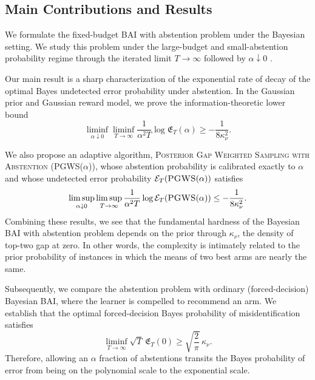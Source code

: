 \documentclass[10pt]{article}
\newcommand{\ouralgfull}{\textsc{Posterior Gap Weighted Sampling with Abstention}}
\newcommand{\ouralg}{{\textnormal{\textsc{PGWS}}}}
\theoremstyle{plain}
\begin{document}
\subsection{Main Contributions and Results}
\label{subsec:main-results}

We formulate the fixed-budget BAI with abstention problem under the Bayesian setting.
We study this problem under the large-budget and small-abstention probability regime through the iterated limit $T\to\infty$ followed by $\alpha\downarrow0$ .


Our main result is a sharp characterization of the exponential rate of decay of the optimal Bayes
undetected error probability under abstention. In the Gaussian
prior and Gaussian reward model, we prove the information-theoretic lower bound
\[
    \liminf_{\alpha\downarrow0}
    \liminf_{T\to\infty}
    \frac{1}{\alpha^2T}
    \log \mathfrak E_{T}(\alpha)
    \ge
    - \frac{1}{8\kappa_\nu^2}.
\]

We also propose an adaptive algorithm, \ouralgfull{} (\ouralg($\alpha$)), whose
abstention probability is  calibrated exactly to $\alpha$ and whose
undetected error probability $\mathcal E_T(\ouralg(\alpha))$ satisfies
\[
    \limsup_{\alpha\downarrow0}
    \limsup_{T\to\infty}
    \frac{1}{\alpha^2T}
    \log \mathcal E_T(\ouralg(\alpha))
    \le
    - \frac{1}{8\kappa_\nu^2}.
\]
Combining these results, we see that the fundamental hardness of  the Bayesian BAI with abstention problem depends on the prior through $\kappa_\nu$, the density of top-two gap at zero. In other words, the  complexity is intimately related to the prior probability of instances in which the means of two best arms are nearly the same.


Subsequently, we compare the abstention problem with ordinary (forced-decision) Bayesian BAI, where the learner is compelled to recommend an arm. We establish that the optimal forced-decision Bayes probability of misidentification satisfies
\[
    \liminf_{T\to\infty}
    \sqrt T\,\mathfrak E_T(0)
    \ge
    \sqrt{\frac{2}{\pi}}\,\kappa_\nu .
\]
Therefore, allowing an $\alpha$ fraction of abstentions transits the Bayes probability of error from being on the
polynomial scale to the exponential scale.

\end{document}
